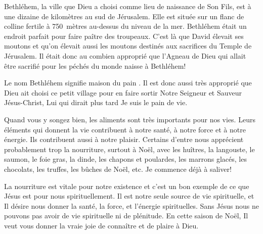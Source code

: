 


Bethléhem, la ville que Dieu a choisi comme lieu de naissance de Son Fils, est à une dizaine de kilomètres au sud de Jérusalem. Elle est située sur un flanc de colline fertile à 750~mètres au-dessus du niveau de la mer. Bethléhem était un endroit parfait pour faire paître des troupeaux. C'est là que David élevait ses moutons et qu'on élevait aussi les moutons destinés aux sacrifices du Temple de Jérusalem. Il était donc au combien approprié que l'Agneau de Dieu qui allait être sacrifié pour les péchés du monde naisse à Bethléhem!

Le nom Bethléhem signifie \og maison du pain \fg{}. Il est donc aussi très approprié que Dieu ait choisi ce petit village pour en faire sortir Notre Seigneur et Sauveur Jésus-Christ, Lui qui dirait plus tard\frcolon{} \og Je suis le pain de vie. \fg{}

Quand vous y songez bien, les aliments sont très importants pour nos vies. Leurs éléments qui donnent la vie contribuent à notre santé, à notre force et à notre énergie. Ils contribuent aussi à notre plaisir. Certains d'entre nous apprécient probablement trop la nourriture, surtout à Noël, avec les huîtres, la langouste, le saumon, le foie gras, la dinde, les chapons et poulardes, les marrons glacés, les chocolats, les truffes, les bûches de Noël, etc. Je commence déjà à saliver!

La nourriture est vitale pour notre existence et c'est un bon exem\-ple de ce que Jésus est pour nous spirituellement. Il est notre seule source de vie spirituelle, et Il désire nous donner la santé, la force, et l'énergie spirituelles. Sans Jésus nous ne pouvons pas avoir de vie spirituelle ni de plénitude. En cette saison de Noël, Il veut vous donner la vraie joie de connaître et de plaire à Dieu.


\ornrule


